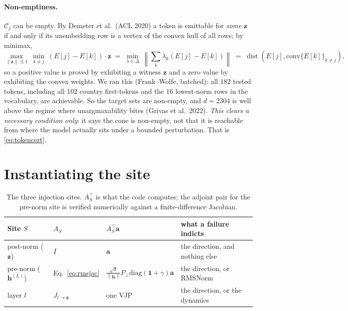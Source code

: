 \documentclass[11pt]{article}
\newcommand{\vh}{\bm{h}}
\newcommand{\vz}{\bm{z}}
\newcommand{\va}{\bm{a}}
\newcommand{\norm}[1]{\left\lVert #1 \right\rVert}
\begin{document}
\paragraph{Non-emptiness.} $\mathcal{C}_j$ can be empty. By Demeter et al.\ (ACL 2020)
a token is emittable for \emph{some} $\vz$ if and only if its unembedding row is a
vertex of the convex hull of all rows; by minimax,
\begin{equation}
  \max_{\norm{\vz}\le 1}\ \min_{k\ne j}\ (E[j]-E[k])\cdot\vz
  \;=\; \min_{\lambda\in\Delta}\ \norm{\textstyle\sum_k \lambda_k (E[j]-E[k])}
  \;=\; \operatorname{dist}\!\left(E[j], \mathrm{conv}\{E[k]\}_{k\ne j}\right),
  \label{eq:hull}
\end{equation}
so a positive value is proved by exhibiting a witness $\vz$ and a zero value by
exhibiting the convex weights. We ran this (Frank--Wolfe, batched): all $182$ tested
tokens, including all $102$ country first-tokens and the $16$ lowest-norm rows in the
vocabulary, are achievable. So the target sets are non-empty, and $d = 2304$ is well
above the regime where unargmaxability bites (Grivas et al.\ 2022). \emph{This clears
a necessary condition only}: it says the cone is non-empty, not that it is reachable
from where the model actually sits under a bounded perturbation. That is
\eqref{eq:tokencert}.

\section{Instantiating the site}

\begin{table}[h]\centering
\begin{tabular}{@{}llll@{}}
\toprule
Site $S$ & $A_S$ & $A_S^{\!\top}\va$ & what a failure indicts \\
\midrule
post-norm ($\vz$) & $I$ & $\va$ & the direction, and nothing else \\
pre-norm ($\vh^{(L)}$) & Eq.~\eqref{eq:rmsjac} &
  $\tfrac{\sqrt d}{\norm{\vh}} P_\perp \mathrm{diag}(\bm 1{+}\gamma)\va$ &
  the direction, or RMSNorm \\
layer $l$ & $J_{l\to \vz}$ & one VJP & the direction, or the dynamics \\
\bottomrule
\end{tabular}
\caption{The three injection sites. $A_S^{\!\top}$ is what the code computes; the
adjoint pair for the pre-norm site is verified numerically against a finite-difference
Jacobian.}
\end{table}
\end{document}
